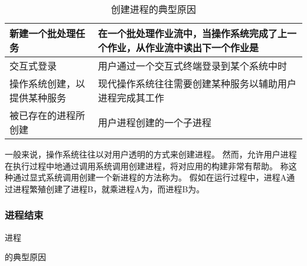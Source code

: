 {{{            \begin{table}[htb]
                \centering

                \caption{创建进程的典型原因}

                \begin{tabular}{l|l}
                    \hline
                    新建一个批处理任务 & 在一个批处理作业流中，当操作系统完成了上一个作业，从作业流中读出下一个作业是 \\
                    \hline
                    交互式登录 & 用户通过一个交互式终端登录到某个系统中时 \\
                    \hline
                    操作系统创建，以提供某种服务 & 现代操作系统往往需要创建某种服务以辅助用户进程完成其工作 \\
                    \hline
                    被已存在的进程所创建 & 用户进程创建的一个子进程 \\
                    \hline
                \end{tabular}
            \end{table}

            一般来说，操作系统往往以对用户透明的方式来创建进程。
            然而，允许用户进程在执行过程中地通过调用系统调用创建进程，将对应用的构建非常有帮助。
            称这种通过显式系统调用创建一个新进程的方法称为。
            假如在运行过程中，进程A通过进程繁殖创建了进程B，就乘进程A为，而进程B为。
        }

        \subsubsection{进程结束}
        {
            \begin{table}[htb]
                \centering

                \caption{进程}的典型原因


\end{table}}}}
